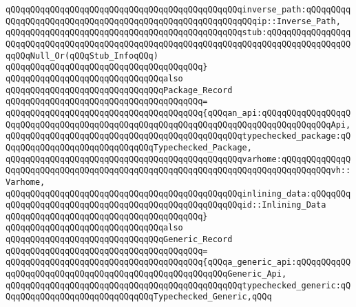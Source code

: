 \verb|qQQqqQQqqQQqqQQqqQQqqQQqqQQqqQQqqQQqqQQqqQQqqQQqinverse_path:qQQqqQQqqQQqqQQqqQQqqQQqqQQqqQQqqQQqqQQqqQQqqQQqqQQqqQQqqQQqip::Inverse_Path,|\newline
\verb|qQQqqQQqqQQqqQQqqQQqqQQqqQQqqQQqqQQqqQQqqQQqqQQqstub:qQQqqQQqqQQqqQQqqQQqqQQqqQQqqQQqqQQqqQQqqQQqqQQqqQQqqQQqqQQqqQQqqQQqqQQqqQQqqQQqqQQqqQQqqQQqNull_Or(qQQqStub_InfoqQQq)|\newline
\verb|qQQqqQQqqQQqqQQqqQQqqQQqqQQqqQQqqQQqqQQq}|\newline
\newline
\newline
\newline
\verb|qQQqqQQqqQQqqQQqqQQqqQQqqQQqqQQqalso|\newline
\verb|qQQqqQQqqQQqqQQqqQQqqQQqqQQqqQQqPackage_Record|\newline
\verb|qQQqqQQqqQQqqQQqqQQqqQQqqQQqqQQqqQQqqQQq=|\newline
\verb|qQQqqQQqqQQqqQQqqQQqqQQqqQQqqQQqqQQqqQQq{qQQqan_api:qQQqqQQqqQQqqQQqqQQqqQQqqQQqqQQqqQQqqQQqqQQqqQQqqQQqqQQqqQQqqQQqqQQqqQQqqQQqqQQqqQQqApi,|\newline
\verb|qQQqqQQqqQQqqQQqqQQqqQQqqQQqqQQqqQQqqQQqqQQqqQQqtypechecked_package:qQQqqQQqqQQqqQQqqQQqqQQqqQQqqQQqTypechecked_Package,|\newline
\verb|qQQqqQQqqQQqqQQqqQQqqQQqqQQqqQQqqQQqqQQqqQQqqQQqvarhome:qQQqqQQqqQQqqQQqqQQqqQQqqQQqqQQqqQQqqQQqqQQqqQQqqQQqqQQqqQQqqQQqqQQqqQQqqQQqqQQqvh::Varhome,|\newline
\verb|qQQqqQQqqQQqqQQqqQQqqQQqqQQqqQQqqQQqqQQqqQQqqQQqinlining_data:qQQqqQQqqQQqqQQqqQQqqQQqqQQqqQQqqQQqqQQqqQQqqQQqqQQqqQQqid::Inlining_Data|\newline
\verb|qQQqqQQqqQQqqQQqqQQqqQQqqQQqqQQqqQQqqQQq}|\newline
\newline
\newline
\newline
\verb|qQQqqQQqqQQqqQQqqQQqqQQqqQQqqQQqalso|\newline
\verb|qQQqqQQqqQQqqQQqqQQqqQQqqQQqqQQqGeneric_Record|\newline
\verb|qQQqqQQqqQQqqQQqqQQqqQQqqQQqqQQqqQQqqQQq=|\newline
\verb|qQQqqQQqqQQqqQQqqQQqqQQqqQQqqQQqqQQqqQQq{qQQqa_generic_api:qQQqqQQqqQQqqQQqqQQqqQQqqQQqqQQqqQQqqQQqqQQqqQQqqQQqqQQqGeneric_Api,|\newline
\verb|qQQqqQQqqQQqqQQqqQQqqQQqqQQqqQQqqQQqqQQqqQQqqQQqtypechecked_generic:qQQqqQQqqQQqqQQqqQQqqQQqqQQqqQQqTypechecked_Generic,qQQq|\newline

